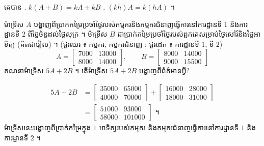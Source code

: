 \begin{formulaBox}[ជាទូទៅ]
គេបាន . $k(A + B) = kA + kB$ . $(kh)A = k(hA)$ ។
\end{formulaBox}

\begin{example}[លំហាត់គំរូ ៥]
ម៉ាទ្រីស $A$ បង្ហាញពីប្រាក់កម្រៃប្រចាំថ្ងៃរបស់កម្មករនិងកម្មករជំនាញធ្វើការនៅការដ្ឋានទី $1$ និងការដ្ឋានទី $2$ ពីថ្ងៃច័ន្ទដល់ថ្ងៃសុក្រ ។ ម៉ាទ្រីស $B$ ជាប្រាក់កម្រៃប្រចាំថ្ងៃរបស់ពួកគេសម្រាប់ថ្ងៃសៅរ៍និងថ្ងៃអាទិត្យ (គិតជារៀល) ។ (ជួរឈរ ៖ កម្មករ, កម្មករជំនាញ ; ជួរដេក ៖ ការដ្ឋានទី $1$, ទី $2$)
\[ A = \begin{bmatrix} 7000 & 13000\\ 8000 & 14000 \end{bmatrix}, \qquad B = \begin{bmatrix} 8000 & 14000\\ 9000 & 15500 \end{bmatrix} \]
គណនាម៉ាទ្រីស $5A + 2B$ ។ តើម៉ាទ្រីស $5A + 2B$ បង្ហាញពីព័ត៌មានអ្វី?
\end{example}
\ans
\[
\begin{aligned}
5A + 2B &= \begin{bmatrix} 35000 & 65000\\ 40000 & 70000 \end{bmatrix} + \begin{bmatrix} 16000 & 28000\\ 18000 & 31000 \end{bmatrix}\\
&= \begin{bmatrix} 51000 & 93000\\ 58000 & 101000 \end{bmatrix} \text{ ។}
\end{aligned}
\]
ម៉ាទ្រីសនេះបង្ហាញពីប្រាក់កម្រៃក្នុង $1$ អាទិត្យរបស់កម្មករ និងកម្មករជំនាញធ្វើការនៅការដ្ឋានទី $1$ និងការដ្ឋានទី $2$ ។

